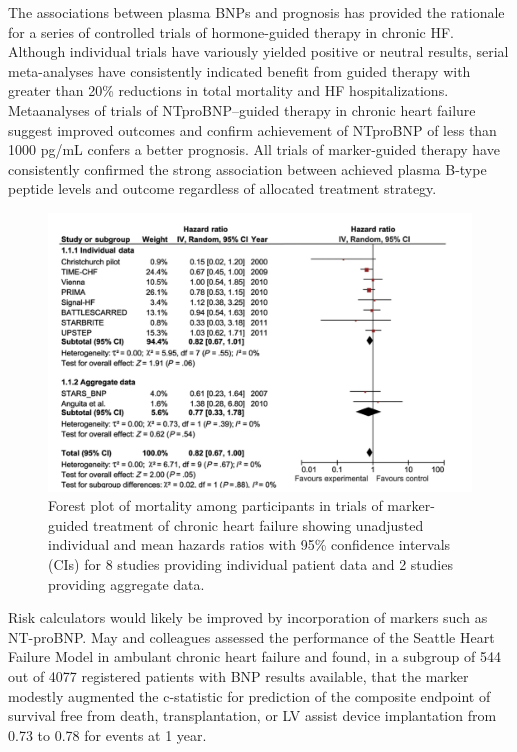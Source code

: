 \documentclass[14pt,a4paper,onecolumn]{extarticle}
\begin{document}
The associations between plasma BNPs and prognosis has provided the rationale for a series of controlled trials of hormone-guided therapy in chronic HF. Although individual trials have variously yielded positive or neutral results, serial meta-analyses have consistently indicated benefit from guided therapy with greater than 20\% reductions in total mortality and HF hospitalizations. Metaanalyses of trials of NTproBNP–guided therapy in chronic heart failure suggest improved outcomes and confirm achievement of NTproBNP of less than 1000 pg/mL confers a better prognosis. All trials of marker-guided therapy have consistently confirmed the strong association between achieved plasma B-type  peptide levels and outcome regardless of allocated treatment strategy. \citep{Troughton2014} %

\begin{figure}   \includegraphics{../../images/NP_treatment.png}   \caption{Forest plot of mortality among participants in trials of marker-guided treatment of chronic heart failure showing unadjusted individual and mean hazards ratios with 95\% confidence intervals (CIs) for 8 studies providing individual patient data and 2 studies providing aggregate data. \citep{Troughton2014}}   \label{NP_treatment} \end{figure} %

Risk calculators would likely be improved by incorporation of markers such as NT-proBNP. May and colleagues assessed the performance of the Seattle Heart Failure Model in ambulant chronic heart failure and found, in a subgroup of 544 out of 4077 registered patients with BNP results available, that the marker modestly augmented the c-statistic for prediction of the composite endpoint of survival free from death, transplantation, or LV assist device implantation from 0.73 to 0.78 for events at 1 year. \citep{May2007} %
\end{document}
